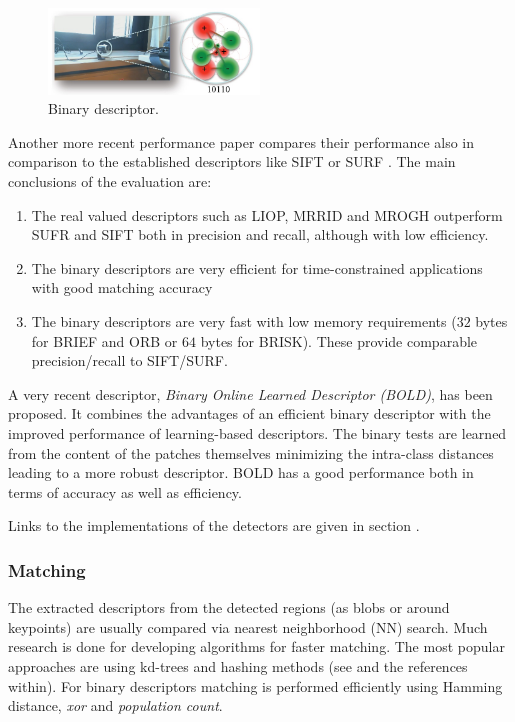 \begin{figure}[H]
\begin{center}
\includegraphics[width=0.5\textwidth]{fig/BinDescr}
\end{center}
\caption{Binary descriptor.}
\label{fig:bindescr}
\end{figure}

Another more recent performance paper compares their performance also in comparison to the established descriptors like SIFT or SURF \cite{conf:icpr:MiksikM12}. The main conclusions of the evaluation are:
\begin{enumerate}
\item{The real valued descriptors such as LIOP, MRRID and MROGH outperform SUFR and SIFT both in precision and recall, although with low efficiency.}
\item{The binary descriptors are very efficient for time-constrained applications with good matching accuracy}
\item{The binary descriptors are very fast with low memory requirements ($32$ bytes for BRIEF and ORB or $64$ bytes for BRISK). These provide comparable precision/recall to SIFT/SURF.}
\end{enumerate}

A very recent descriptor, {\em Binary Online Learned Descriptor (BOLD)}, \cite{Balntas_2015_CVPR} has been proposed. It combines the advantages of an efficient binary descriptor with the improved performance of learning-based descriptors. The binary tests are learned from the content of the patches themselves minimizing the intra-class distances leading to a more robust descriptor. BOLD has a good performance both in terms of accuracy as well as efficiency.

Links to the implementations of the detectors are given in section .
\subsubsection{Matching}
The extracted descriptors from the detected regions (as blobs or around keypoints) are usually compared via nearest neighborhood (NN) search. Much research is done for developing algorithms for faster matching. The most popular approaches are using kd-trees and hashing methods (see \cite{conf:icpr:MiksikM12} and the references within). For binary descriptors matching is performed efficiently using Hamming distance, {\em xor} and {\em population count}.


